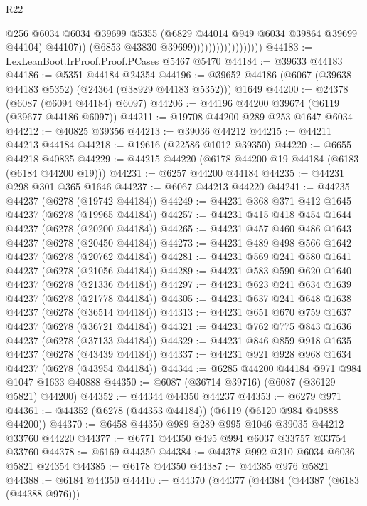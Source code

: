 \begin{lexlean}{R22}
\begin{coremodule}
                                          @256
                                          @6034
                                          @6034
                                          @39699
                                          @5355
                                          (@6829 @44014 @949 @6034 @39864 @39699 @44104)
                                          @44107))
                                      (@6853 @43830 @39699))))))))))))))))))
@44183 := LexLeanBoot.IrProof.Proof.PCases @5467 @5470
@44184 := @39633 @44183
@44186 := @5351 @44184 @24354
@44196 := @39652 @44186 (@6067 (@39638 @44183 @5352) (@24364 (@38929 @44183 @5352))) @1649
@44200 := @24378 (@6087 (@6094 @44184) @6097)
@44206 := @44196 @44200 @39674 (@6119 (@39677 @44186 @6097))
@44211 := @19708 @44200 @289 @253 @1647 @6034
@44212 := @40825 @39356
@44213 := @39036 @44212
@44215 := @44211 @44213 @44184
@44218 := @19616 (@22586 @1012 @39350)
@44220 := @6655 @44218 @40835
@44229 := @44215 @44220 (@6178 @44200 @19 @44184 (@6183 (@6184 @44200 @19)))
@44231 := @6257 @44200 @44184
@44235 := @44231 @298 @301 @365 @1646
@44237 := @6067 @44213 @44220
@44241 := @44235 @44237 (@6278 (@19742 @44184))
@44249 := @44231 @368 @371 @412 @1645 @44237 (@6278 (@19965 @44184))
@44257 := @44231 @415 @418 @454 @1644 @44237 (@6278 (@20200 @44184))
@44265 := @44231 @457 @460 @486 @1643 @44237 (@6278 (@20450 @44184))
@44273 := @44231 @489 @498 @566 @1642 @44237 (@6278 (@20762 @44184))
@44281 := @44231 @569 @241 @580 @1641 @44237 (@6278 (@21056 @44184))
@44289 := @44231 @583 @590 @620 @1640 @44237 (@6278 (@21336 @44184))
@44297 := @44231 @623 @241 @634 @1639 @44237 (@6278 (@21778 @44184))
@44305 := @44231 @637 @241 @648 @1638 @44237 (@6278 (@36514 @44184))
@44313 := @44231 @651 @670 @759 @1637 @44237 (@6278 (@36721 @44184))
@44321 := @44231 @762 @775 @843 @1636 @44237 (@6278 (@37133 @44184))
@44329 := @44231 @846 @859 @918 @1635 @44237 (@6278 (@43439 @44184))
@44337 := @44231 @921 @928 @968 @1634 @44237 (@6278 (@43954 @44184))
@44344 := @6285 @44200 @44184 @971 @984 @1047 @1633 @40888
@44350 := @6087 (@36714 @39716) (@6087 (@36129 @5821) @44200)
@44352 := @44344 @44350 @44237
@44353 := @6279 @971
@44361 := @44352 (@6278 (@44353 @44184)) (@6119 (@6120 @984 @40888 @44200))
@44370 := @6458 @44350 @989 @289 @995 @1046 @39035 @44212 @33760 @44220
@44377 := @6771 @44350 @495 @994 @6037 @33757 @33754 @33760
@44378 := @6169 @44350
@44384 := @44378 @992 @310 @6034 @6036 @5821 @24354
@44385 := @6178 @44350
@44387 := @44385 @976 @5821
@44388 := @6184 @44350
@44410 := @44370
    (@44377
      (@44384
        (@44387 (@6183 (@44388 @976)))

\end{coremodule}
\end{lexlean}
